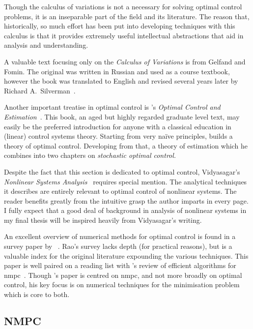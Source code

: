 Though the calculus of variations is not a necessary for solving optimal control
problems, it is an inseparable part of the field and its literature. The reason
that, historically, so much effort has been put into developing techniques with
this calculus is that it provides extremely useful intellectual abstractions
that aid in analysis and understanding.

A valuable text focusing only on the \emph{Calculus of Variations} is from
Gelfand and Fomin. The original was written in Russian and used as a course
textbook, however the book was translated to English and revised several years
later by Richard A.\ Silverman~\cite{gelfand2000calculus}.

Another important treatise in optimal control is
\citeauthor{stengel1986optimal}'s \emph{Optimal Control and
Estimation}~\cite{stengel1986optimal}. This book, an aged but highly regarded
graduate level text, may easily be the preferred introduction for anyone with a
classical education in (linear) control systems theory. Starting from very
naïve principles, \citeauthor{stengel1986optimal} builds a theory of optimal
control. Developing from that, a theory of estimation which he combines into two
chapters on \emph{stochastic optimal control.}

Despite the fact that this section is dedicated to optimal control, Vidyasagar's
\emph{Nonlinear Systems Analysis}~\cite{Vidyasagar2002} requires special
mention. The analytical techniques it describes are entirely relevant to optimal
control of nonlinear systems. The reader benefits greatly from the intuitive
grasp the author imparts in every page. I fully expect that a good deal of
background in analysis of nonlinear systems in my final thesis will be inspired
heavily from Vidyasagar's writing.

An excellent overview of numerical methods for optimal control is found in a
survey paper by \citeauthor{rao2009survey}~\cite{rao2009survey}. Rao's survey
lacks depth (for practical reasons), but is a valuable index for the original
literature expounding the various techniques. This paper is well paired on a
reading list with \citeauthor{Cannon2004}'s review of efficient algorithms for
\ac{nmpc}~\cite{Cannon2004}. Though \citeauthor{Cannon2004}'s paper is centred
on \ac{nmpc}, and not more broadly on optimal control, his key focus is on
numerical techniques for the minimisation problem which is core to both.



\subsection{NMPC}



